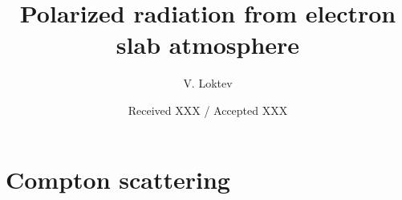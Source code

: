 \documentclass[iop, usenatbib]{emulateapj}
\begin{document}
\title{Polarized radiation from electron slab atmosphere}



\author{ V. Loktev }


\date{Received XXX / Accepted XXX}



\begin{abstract}
\lipsum[1]
\end{abstract}




\maketitle

\section{Compton scattering}\label{Compton}
\end{document}
